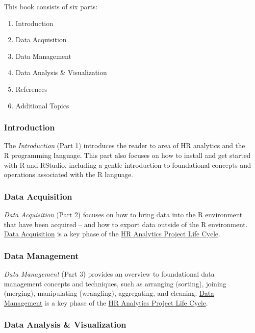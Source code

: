 \documentclass[]{book}
\providecommand{\tightlist}{%
  \setlength{\itemsep}{0pt}\setlength{\parskip}{0pt}}
\begin{document}
This book consists of six parts:

\begin{enumerate}
\def\labelenumi{\arabic{enumi}.}
\tightlist
\item
  Introduction
\item
  Data Acquisition
\item
  Data Management
\item
  Data Analysis \& Visualization
\item
  References
\item
  Additional Topics
\end{enumerate}

\subsubsection{Introduction}\label{introductionpref}

The \emph{Introduction} (Part 1) introduces the reader to area of HR
analytics and the R programming language. This part also focuses on how
to install and get started with R and RStudio, including a gentle
introduction to foundational concepts and operations associated with the
R language.

\subsubsection{Data Acquisition}\label{dataacquirepref}

\emph{Data Acquisition} (Part 2) focuses on how to bring data into the R
environment that have been acquired -- and how to export data outside of
the R environment. \protect\hyperlink{dacquire}{Data Acquisition} is a
key phase of the \protect\hyperlink{hraplc}{HR Analytics Project Life
Cycle}.

\subsubsection{Data Management}\label{datamanagepref}

\emph{Data Management} (Part 3) provides an overview to foundational
data management concepts and techniques, such as arranging (sorting),
joining (merging), manipulating (wrangling), aggregating, and cleaning.
\protect\hyperlink{dmanage}{Data Management} is a key phase of the
\protect\hyperlink{hraplc}{HR Analytics Project Life Cycle}.

\subsubsection{Data Analysis \& Visualization}\label{dataanalvizpref}
\end{document}
